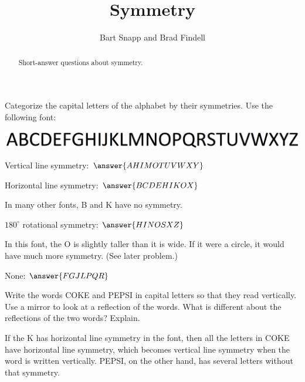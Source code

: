 \documentclass[nooutcomes]{ximera}
\title{Symmetry}
\author{Bart Snapp and Brad Findell}
\begin{document}
\begin{abstract}
Short-answer questions about symmetry. 
\end{abstract}
\maketitle

\begin{question}
Categorize the capital letters of the alphabet by their symmetries.  Use the following font: 
\begin{image}
\includegraphics{alphabet.png}
\end{image}
\begin{question}
Vertical line symmetry:  $\answer{AHIMOTUVWXY}$
\end{question}
\begin{question}
Horizontal line symmetry:  $\answer{BCDEHIKOX}$  
\begin{feedback}[correct]
In many other fonts, B and K have no symmetry.  
\end{feedback}
\end{question}
\begin{question}
$180^\circ$ rotational symmetry: $\answer{HINOSXZ}$
\begin{feedback}[correct]
In this font, the O is slightly taller than it is wide.  If it were a circle, it would have much more symmetry.  (See later problem.)
\end{feedback}
\end{question}
\begin{question}
None: $\answer{FGJLPQR}$
\end{question}
\end{question}

\begin{question}
Write the words COKE and PEPSI in capital letters so that they read vertically.  Use a mirror to look at a reflection of the words.  What is different about the reflections of the two words?  Explain.  
\begin{freeResponse}
\end{freeResponse}
\begin{hint}
If the K has horizontal line symmetry in the font, then all the letters in COKE have horizontal line symmetry, which becomes vertical line symmetry when the word is written vertically. PEPSI, on the other hand, has several letters without that symmetry.  
\end{hint}
\end{question}
\end{document}
